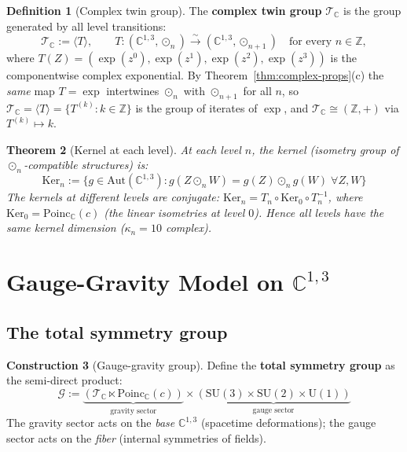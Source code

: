 \documentclass[12pt]{article}
\theoremstyle{plain}
\newtheorem{theorem}{Theorem}[section]
\theoremstyle{definition}
\newtheorem{definition}[theorem]{Definition}
\newtheorem{construction}[theorem]{Construction}
\theoremstyle{remark}
\newcommand{\Aut}{\mathrm{Aut}}
\newcommand{\Ker}{\mathrm{Ker}}
\newcommand{\Poinc}{\mathrm{Poinc}}
\newcommand{\SU}{\mathrm{SU}}
\newcommand{\UU}{\mathrm{U}}
\newcommand{\CC}{\mathbb{C}}
\newcommand{\ZZ}{\mathbb{Z}}
\begin{document}
\begin{definition}[Complex twin group]\label{def:twin-group}
The \textbf{complex twin group} $\mathcal{T}_\CC$ is the group generated by all level transitions:
\begin{equation}
\mathcal{T}_\CC := \langle T \rangle, \qquad T: (\CC^{1,3}, \odot_n) \xrightarrow{\sim} (\CC^{1,3}, \odot_{n+1}) \quad \text{for every } n \in \ZZ,
\end{equation}
where $T(Z) = (\exp(z^0), \exp(z^1), \exp(z^2), \exp(z^3))$ is the componentwise complex exponential. By Theorem~\ref{thm:complex-props}(c) the \emph{same} map $T = \exp$ intertwines $\odot_n$ with $\odot_{n+1}$ for all $n$, so $\mathcal{T}_\CC = \langle T \rangle = \{T^{(k)} : k \in \ZZ\}$ is the group of iterates of $\exp$, and $\mathcal{T}_\CC \cong (\ZZ, +)$ via $T^{(k)} \mapsto k$.
\end{definition}

\begin{theorem}[Kernel at each level]\label{thm:kernel-level}
At each level $n$, the kernel (isometry group of $\odot_n$-compatible structures) is:
\begin{equation}
\Ker_n := \{g \in \Aut(\CC^{1,3}) : g(Z \odot_n W) = g(Z) \odot_n g(W)\;\forall Z, W\}
\end{equation}
The kernels at different levels are conjugate: $\Ker_n = T_n \circ \Ker_0 \circ T_n^{-1}$, where $\Ker_0 = \Poinc_\CC(c)$ (the linear isometries at level $0$). Hence all levels have the same kernel dimension ($\kappa_n = 10$ complex).
\end{theorem}


\section{Gauge-Gravity Model on $\CC^{1,3}$}
\label{sec:gauge-gravity}

\subsection{The total symmetry group}

\begin{construction}[Gauge-gravity group]\label{constr:gauge-gravity}
Define the \textbf{total symmetry group} as the semi-direct product:
\begin{equation}\label{eq:total-group}
\boxed{\mathcal{G} := \underbrace{(\mathcal{T}_\CC \ltimes \Poinc_\CC(c))}_{\text{gravity sector}} \times \underbrace{(\SU(3) \times \SU(2) \times \UU(1))}_{\text{gauge sector}}}
\end{equation}
The gravity sector acts on the \emph{base} $\CC^{1,3}$ (spacetime deformations); the gauge sector acts on the \emph{fiber} (internal symmetries of fields).
\end{construction}
\end{document}
